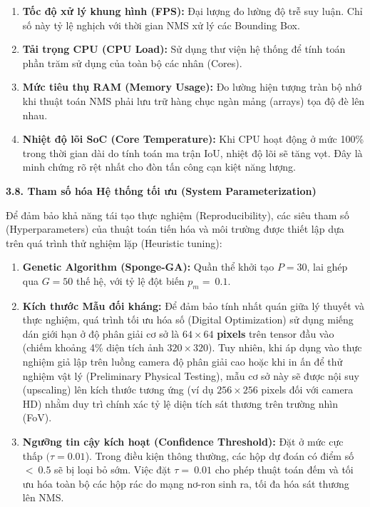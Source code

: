 \begin{enumerate}
\def\labelenumi{\arabic{enumi}.}
\item
  \textbf{Tốc độ xử lý khung hình (FPS):} Đại lượng đo lường độ trễ suy
  luận. Chỉ số này tỷ lệ nghịch với thời gian NMS xử lý các Bounding
  Box.
\item
  \textbf{Tải trọng CPU (CPU Load):} Sử dụng thư viện hệ thống để tính
  toán phần trăm sử dụng của toàn bộ các nhân (Cores).
\item
  \textbf{Mức tiêu thụ RAM (Memory Usage):} Đo lường hiện tượng tràn bộ
  nhớ khi thuật toán NMS phải lưu trữ hàng chục ngàn mảng (arrays) tọa
  độ đè lên nhau.
\item
  \textbf{Nhiệt độ lõi SoC (Core Temperature):} Khi CPU hoạt động ở mức
  100\% trong thời gian dài do tính toán ma trận IoU, nhiệt độ lõi sẽ
  tăng vọt. Đây là minh chứng rõ rệt nhất cho đòn tấn công cạn kiệt năng
  lượng.
\end{enumerate}

\textbf{3.8. Tham số hóa Hệ thống tối ưu (System Parameterization)}

Để đảm bảo khả năng tái tạo thực nghiệm (Reproducibility), các siêu tham
số (Hyperparameters) của thuật toán tiến hóa và môi trường được thiết
lập dựa trên quá trình thử nghiệm lặp (Heuristic tuning):

\begin{enumerate}
\def\labelenumi{\arabic{enumi}.}
\item
  \textbf{Genetic Algorithm (Sponge-GA):} Quần thể khởi tạo \(P = 30\),
  lai ghép qua \(G = 50\) thế hệ, với tỷ lệ đột biến \(p_{m} = \ 0.1\).
\item
  \textbf{Kích thước Mẫu đối kháng:} Để đảm bảo tính nhất quán giữa lý
  thuyết và thực nghiệm, quá trình tối ưu hóa số (Digital Optimization)
  sử dụng miếng dán giới hạn ở độ phân giải cơ sở là \(64 \times 64\)
  \textbf{pixels} trên tensor đầu vào (chiếm khoảng 4\% diện tích ảnh
  \(320 \times 320\)). Tuy nhiên, khi áp dụng vào thực nghiệm giả lập
  trên luồng camera độ phân giải cao hoặc khi in ấn để thử nghiệm vật lý
  (Preliminary Physical Testing), mẫu cơ sở này sẽ được nội suy
  (upscaling) lên kích thước tương ứng (ví dụ \(256 \times 256\) pixels
  đối với camera HD) nhằm duy trì chính xác tỷ lệ diện tích sát thương
  trên trường nhìn (FoV).
\item
  \textbf{Ngưỡng tin cậy kích hoạt (Confidence Threshold):} Đặt ở mức
  cực thấp \((\tau = 0.01\)). Trong điều kiện thông thường, các hộp dự
  đoán có điểm số \(< \ 0.5\) sẽ bị loại bỏ sớm. Việc đặt
  \(\tau = \ 0.01\) cho phép thuật toán đếm và tối ưu hóa toàn bộ các
  hộp rác do mạng nơ-ron sinh ra, tối đa hóa sát thương lên NMS.
\end{enumerate}

